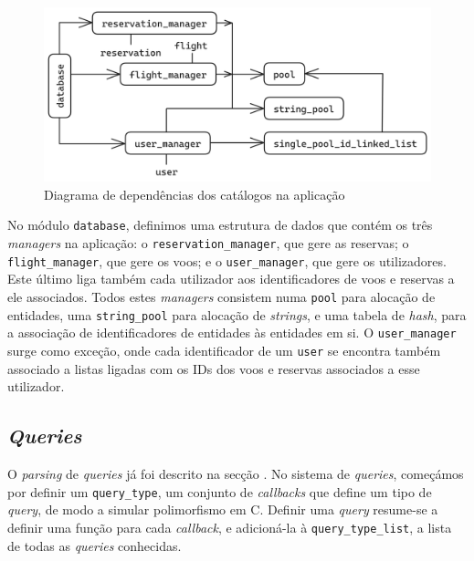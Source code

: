 \documentclass[12pt, a4paper]{article}
\begin{document}
\begin{figure}[ht]
    \centering
    \includegraphics[scale=0.2]{res/database.png}
    \caption{Diagrama de dependências dos catálogos na aplicação}
    \label{fig:catalogs}
\end{figure}

No módulo \texttt{database}, definimos uma estrutura de dados que contém os três \emph{managers} na
aplicação: o \texttt{reservation\_manager}, que gere as reservas; o \texttt{flight\_manager}, que gere
os voos; e o \texttt{user\_manager}, que gere os utilizadores. Este último liga também cada utilizador aos
identificadores de voos e reservas a ele associados. Todos estes \emph{managers} consistem numa
\texttt{pool} para alocação de entidades, uma \texttt{string\_pool} para alocação de \emph{strings},
e uma tabela de \emph{hash}, para a associação de identificadores de entidades às entidades em si.
O \texttt{user\_manager} surge como exceção, onde cada identificador de um \texttt{user} se
encontra também associado a listas ligadas com os IDs dos voos e reservas associados a esse
utilizador.

\subsection{\emph{Queries}}
\label{sec:queries}

O \emph{parsing} de \emph{queries} já foi descrito na secção . No sistema de
\emph{queries}, começámos por definir um \texttt{query\_type}, um conjunto de \emph{callbacks} que
define um tipo de \emph{query}, de modo a simular polimorfismo em C. Definir uma \emph{query}
resume-se a definir uma função para cada \emph{callback}, e adicioná-la à
\texttt{query\_type\_list}, a lista de todas as \emph{queries} conhecidas.
\end{document}
